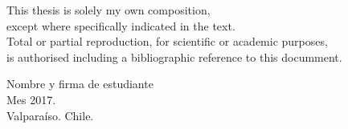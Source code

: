 \begin{center}
\phantom{.}
\vspace{7cm}
This thesis is solely my own composition, \\
except where specifically
indicated in the text.\\
\vspace{0.5cm}
Total or partial reproduction, for scientific or academic purposes, \\
is authorised including a bibliographic reference to this documment.

\vspace{4cm}

Nombre y firma de estudiante \\
Mes 2017.\\
Valpara\'iso. Chile.
\end{center}
